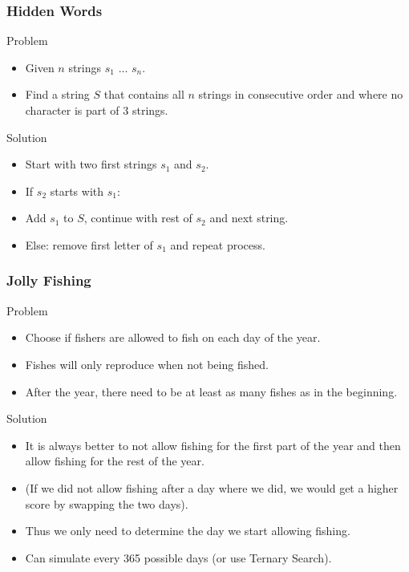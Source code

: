 \documentclass{beamer}
\begin{document}
\begin{frame}
    \frametitle{Hidden Words}
    \begin{block}{Problem}
        \begin{itemize}
            \item Given $n$ strings $s_1$ ... $s_n$.
            \item Find a string $S$ that contains all $n$ strings in consecutive order and where no character is part of 3 strings.
        \end{itemize}
    \end{block}
    \begin{block}{Solution}
        \begin{itemize}
            \item Start with two first strings $s_1$ and $s_2$.
            \item If $s_2$ starts with $s_1$:
            \item Add $s_1$ to $S$, continue with rest of $s_2$ and next string.
            \item Else: remove first letter of $s_1$ and repeat process.
        \end{itemize}
    \end{block}
\end{frame}

\begin{frame}
    \frametitle{Jolly Fishing}
    \begin{block}{Problem}
        \begin{itemize}
            \item Choose if fishers are allowed to fish on each day of the year.
            \item Fishes will only reproduce when not being fished.
            \item After the year, there need to be at least as many fishes as in the beginning.
        \end{itemize}
    \end{block}
    \begin{block}{Solution}
        \begin{itemize}
            \item It is always better to not allow fishing for the first part of the year and then allow fishing for the rest of the year.
            \item (If we did not allow fishing after a day where we did, we would get a higher score by swapping the two days).
            \item Thus we only need to determine the day we start allowing fishing.
            \item Can simulate every 365 possible days (or use Ternary Search).
        \end{itemize}
    \end{block}
\end{frame}
\end{document}
